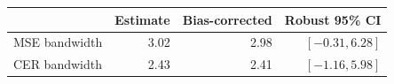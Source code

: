 \begin{center}
\small\renewcommand{\arraystretch}{1.3}
\begin{tabular}{@{}lrrr@{}}\toprule
 & Estimate & Bias-corrected & Robust 95\% CI\\\midrule
MSE bandwidth & 3.02 & 2.98 & $[-0.31, 6.28]$\\
CER bandwidth & 2.43 & 2.41 & $[-1.16, 5.98]$\\
\bottomrule\end{tabular}
\end{center}
